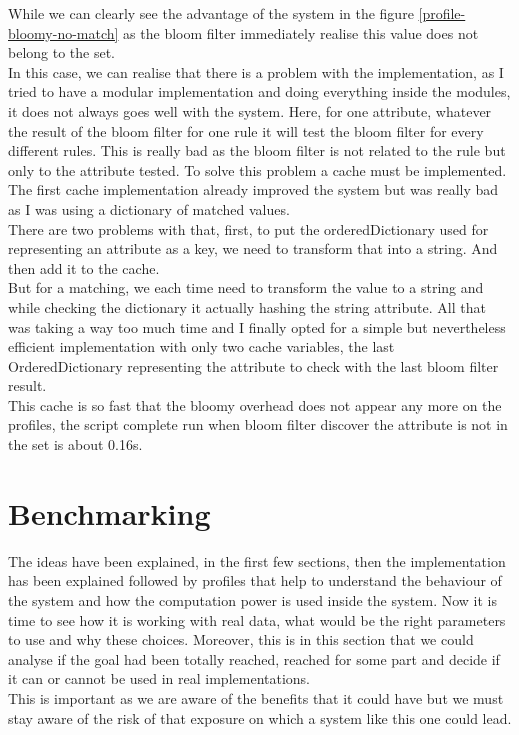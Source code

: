 \documentclass{eplmastersthesis}
\begin{document}
While we can clearly see the advantage of the system in the figure \ref{profile-bloomy-no-match} as the bloom filter immediately realise this value does not belong to the set.\\

In this case, we can realise that there is a problem with the implementation, as I tried to have a modular implementation and doing everything inside the modules, it does not always goes well with the system. Here, for one attribute, whatever the result of the bloom filter for one rule it will test the bloom filter for every different rules. This is really bad as the bloom filter is not related to the rule but only to the attribute tested. To solve this problem a cache must be implemented. The first cache implementation already improved the system but was really bad as I was using a dictionary of matched values.\\
There are two problems with that, first, to put the orderedDictionary used for representing an attribute as a key, we need to transform that into a string. And then add it to the cache.\\
But for a matching, we each time need to transform the value to a string and while checking the dictionary it actually hashing the string attribute. All that was taking a way too much time and I finally opted for a simple but nevertheless efficient implementation with only two cache variables, the last OrderedDictionary representing the attribute to check with the last bloom filter result.\\
This cache is so fast that the bloomy overhead does not appear any more on the profiles, the script complete run when bloom filter discover the attribute is not in the set is about 0.16s.\\

\section{Benchmarking}
The ideas have been explained, in the first few sections, then the implementation has been explained followed by profiles that help to understand the behaviour of the system and how the computation power is used inside the system. Now it is time to see how it is working with real data, what would be the right parameters to use and why these choices. Moreover, this is in this section that we could analyse if the goal had been totally reached, reached for some part and decide if it can or cannot be used in real implementations.\\
This is important as we are aware of the benefits that it could have but we must stay aware of the risk of that exposure on which a system like this one could lead.\\
\end{document}
